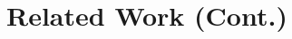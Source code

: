\documentclass{article}
\begin{document}







\appendix


\section{Related Work (Cont.)}
\end{document}
